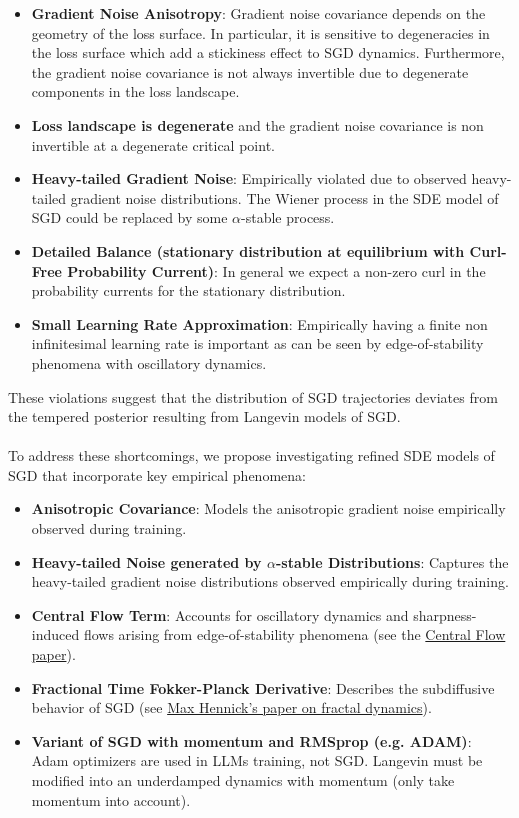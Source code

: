 \documentclass[11pt]{article}
\begin{document}
\begin{itemize}
\item \textbf{Gradient Noise Anisotropy}: Gradient noise covariance depends on the geometry of the loss surface. In particular, it is sensitive to degeneracies in the loss surface which add a stickiness effect to SGD dynamics. Furthermore, the gradient noise covariance is not always invertible due to degenerate components in the loss landscape.
\item \textbf{Loss landscape is degenerate} and the gradient noise covariance is non invertible at a degenerate critical point.
\item \textbf{Heavy-tailed Gradient Noise}: Empirically violated due to observed heavy-tailed gradient noise distributions. The Wiener process in the SDE model of SGD could be replaced by some $\alpha$-stable process.
\item \textbf{Detailed Balance (stationary distribution at equilibrium with Curl-Free Probability Current)}: In general we expect a non-zero curl in the probability currents for the stationary distribution.
\item \textbf{Small Learning Rate Approximation}: Empirically having a finite non infinitesimal learning rate is important as can be seen by edge-of-stability phenomena with oscillatory dynamics.
\end{itemize}
These violations suggest that the distribution of SGD trajectories deviates from the tempered posterior resulting from Langevin models of SGD. 
\\
\\
To address these shortcomings, we propose investigating refined SDE models of SGD that incorporate key empirical phenomena:
\begin{itemize}
\item \textbf{Anisotropic Covariance}: Models the anisotropic gradient noise empirically observed during training.
\item \textbf{Heavy-tailed Noise generated by $\alpha$-stable Distributions}: Captures the heavy-tailed gradient noise distributions observed empirically during training.
\item \textbf{Central Flow Term}: Accounts for oscillatory dynamics and sharpness-induced flows arising from edge-of-stability phenomena (see the \href{https://arxiv.org/abs/2410.24206}{Central Flow paper}).
\item \textbf{Fractional Time Fokker-Planck Derivative}: Describes the subdiffusive behavior of SGD (see \href{https://arxiv.org/abs/2503.22478}{Max Hennick's paper on fractal dynamics}).
\item \textbf{Variant of SGD with momentum and RMSprop (e.g. ADAM)}: Adam optimizers are used in LLMs training, not SGD. Langevin must be modified into an underdamped dynamics with momentum (only take momentum into account). 
\end{itemize}
\end{document}
